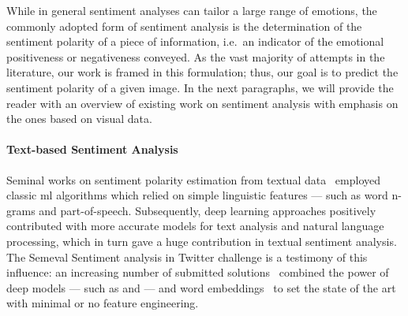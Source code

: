 While in general sentiment analyses can tailor a large range of emotions, the commonly adopted form of sentiment analysis is the determination of the sentiment polarity of a piece of information, i.e.\ an indicator of the emotional positiveness or negativeness conveyed.
As the vast majority of attempts in the literature, our work is framed in this formulation;
thus, our goal is to predict the sentiment polarity of a given image. %
In the next paragraphs, we will provide the reader with an overview of existing work on sentiment analysis with emphasis on the ones based on visual data.

\paragraph{Text-based Sentiment Analysis}
Seminal works on sentiment polarity estimation from textual data~\cite{go2009twitter,bermingham2010classifying} employed classic \gls{ml} algorithms which relied on simple linguistic features --- such as word n-grams and part-of-speech.
Subsequently, deep learning approaches positively contributed with more accurate models for text analysis and natural language processing, which in turn gave a huge contribution in textual sentiment analysis.
The Semeval Sentiment analysis in Twitter \cite{nakov2016semeval} challenge is a testimony of this influence: an increasing number of submitted solutions~\cite{deriu2016swisscheese,rouvier2016sensei} combined the power of deep models --- such as  and  --- and word embeddings~\cite{mikolov2013distributed,pennington2014glove} to set the state of the art with minimal or no feature engineering.

